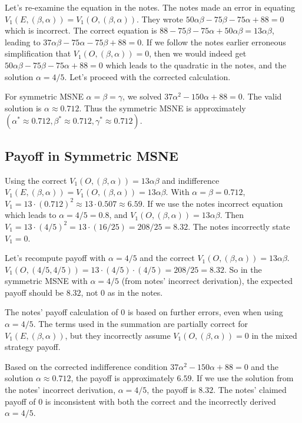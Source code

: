 \documentclass{article}
\begin{document}
Let's re-examine the equation in the notes. The notes made an error in equating $V_1(E, (\beta, \alpha)) = V_1(O, (\beta, \alpha))$. They wrote $50\alpha\beta - 75\beta - 75\alpha + 88 = 0$ which is incorrect.  The correct equation is $88 - 75\beta - 75\alpha + 50\alpha\beta = 13\alpha\beta$, leading to $37\alpha\beta - 75\alpha - 75\beta + 88 = 0$. If we follow the notes earlier erroneous simplification that $V_1(O, (\beta, \alpha)) = 0$, then we would indeed get $50\alpha\beta - 75\beta - 75\alpha + 88 = 0$ which leads to the quadratic in the notes, and the solution $\alpha = 4/5$.  Let's proceed with the corrected calculation.

For symmetric MSNE $\alpha=\beta=\gamma$, we solved $37\alpha^2 - 150\alpha + 88 = 0$.
The valid solution is $\alpha \approx 0.712$. Thus the symmetric MSNE is approximately $(\alpha^* \approx 0.712, \beta^* \approx 0.712, \gamma^* \approx 0.712)$.

\subsection{Payoff in Symmetric MSNE}
Using the correct $V_1(O, (\beta, \alpha)) = 13\alpha\beta$ and indifference $V_1(E, (\beta, \alpha)) = V_1(O, (\beta, \alpha)) = 13\alpha\beta$.
With $\alpha = \beta = 0.712$, $V_1 = 13 \cdot (0.712)^2 \approx 13 \cdot 0.507 \approx 6.59$.
If we use the notes incorrect equation which leads to $\alpha = 4/5 = 0.8$, and $V_1(O, (\beta, \alpha)) = 13\alpha\beta$. Then $V_1 = 13 \cdot (4/5)^2 = 13 \cdot (16/25) = 208/25 = 8.32$. The notes incorrectly state $V_1 = 0$.

Let's recompute payoff with $\alpha=4/5$ and the correct $V_1(O, (\beta, \alpha)) = 13\alpha\beta$.
$V_1(O, (4/5, 4/5)) = 13 \cdot (4/5) \cdot (4/5) = 208/25 = 8.32$.
So in the symmetric MSNE with $\alpha = 4/5$ (from notes' incorrect derivation), the expected payoff should be $8.32$, not $0$ as in the notes.

The notes' payoff calculation of $0$ is based on further errors, even when using $\alpha = 4/5$. The terms used in the summation are partially correct for $V_1(E, (\beta, \alpha))$, but they incorrectly assume $V_1(O, (\beta, \alpha)) = 0$ in the mixed strategy payoff.

Based on the corrected indifference condition $37\alpha^2 - 150\alpha + 88 = 0$ and the solution $\alpha \approx 0.712$, the payoff is approximately $6.59$.  If we use the solution from the notes' incorrect derivation, $\alpha = 4/5$, the payoff is $8.32$.  The notes' claimed payoff of $0$ is inconsistent with both the correct and the incorrectly derived $\alpha=4/5$.
\end{document}
